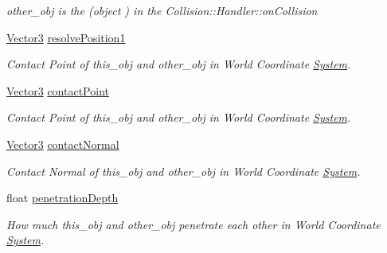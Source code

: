 \begin{DoxyCompactItemize}
\begin{DoxyCompactList}\small\item\em other\+\_\+obj is the (object ) in the Collision\+::\+Handler\+::on\+Collision \end{DoxyCompactList}\item 
\hyperlink{class_magnum_1_1_vector3}{Vector3} \hyperlink{class_magnum_1_1_collision_1_1_contact_info_a227adba36f12aa53d2a24cd59bc17d5e}{resolve\+Position1}\hypertarget{class_magnum_1_1_collision_1_1_contact_info_a227adba36f12aa53d2a24cd59bc17d5e}{}\label{class_magnum_1_1_collision_1_1_contact_info_a227adba36f12aa53d2a24cd59bc17d5e}

\begin{DoxyCompactList}\small\item\em Contact Point of this\+\_\+obj and other\+\_\+obj in World Coordinate \hyperlink{class_magnum_1_1_system}{System}. \end{DoxyCompactList}\item 
\hyperlink{class_magnum_1_1_vector3}{Vector3} \hyperlink{class_magnum_1_1_collision_1_1_contact_info_aecd1c589c354415ae8cbce03b2351edd}{contact\+Point}\hypertarget{class_magnum_1_1_collision_1_1_contact_info_aecd1c589c354415ae8cbce03b2351edd}{}\label{class_magnum_1_1_collision_1_1_contact_info_aecd1c589c354415ae8cbce03b2351edd}

\begin{DoxyCompactList}\small\item\em Contact Point of this\+\_\+obj and other\+\_\+obj in World Coordinate \hyperlink{class_magnum_1_1_system}{System}. \end{DoxyCompactList}\item 
\hyperlink{class_magnum_1_1_vector3}{Vector3} \hyperlink{class_magnum_1_1_collision_1_1_contact_info_a48b3de0450d19f8085d3c46f389a5853}{contact\+Normal}\hypertarget{class_magnum_1_1_collision_1_1_contact_info_a48b3de0450d19f8085d3c46f389a5853}{}\label{class_magnum_1_1_collision_1_1_contact_info_a48b3de0450d19f8085d3c46f389a5853}

\begin{DoxyCompactList}\small\item\em Contact Normal of this\+\_\+obj and other\+\_\+obj in World Coordinate \hyperlink{class_magnum_1_1_system}{System}. \end{DoxyCompactList}\item 
float \hyperlink{class_magnum_1_1_collision_1_1_contact_info_a3f1a8e7183e06ccd70f1f8173d9e20cd}{penetration\+Depth}\hypertarget{class_magnum_1_1_collision_1_1_contact_info_a3f1a8e7183e06ccd70f1f8173d9e20cd}{}\label{class_magnum_1_1_collision_1_1_contact_info_a3f1a8e7183e06ccd70f1f8173d9e20cd}

\begin{DoxyCompactList}\small\item\em How much this\+\_\+obj and other\+\_\+obj penetrate each other in World Coordinate \hyperlink{class_magnum_1_1_system}{System}. \end{DoxyCompactList}\end{DoxyCompactItemize}


